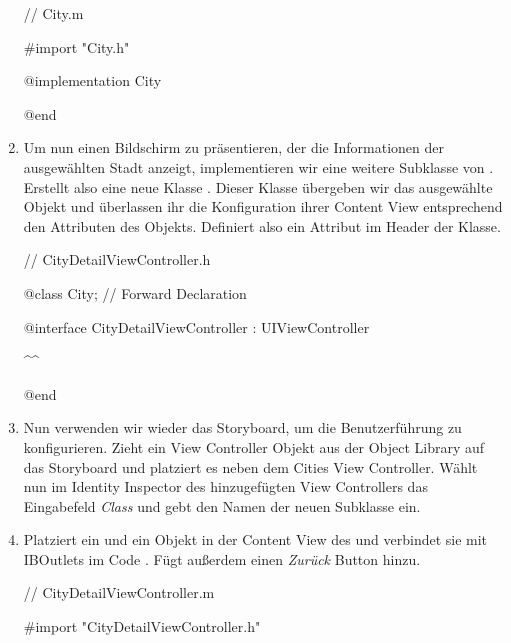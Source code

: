 \documentclass[parskip=half, final]{scrreprt}
\begin{document}
\begin{lecture}
\begin{enumerate}
\begin{objclst}
// City.m

#import "City.h"

@implementation City

@end
\end{objclst}

\item Um nun einen Bildschirm zu präsentieren, der die Informationen der ausgewählten Stadt anzeigt, implementieren wir eine weitere Subklasse von . Erstellt also eine neue Klasse . Dieser Klasse übergeben wir das ausgewählte  Objekt und überlassen ihr die Konfiguration ihrer Content View entsprechend den Attributen des Objekts. Definiert also ein Attribut  im Header der  Klasse.

\begin{objclst}
// CityDetailViewController.h

@class City; // Forward Declaration

@interface CityDetailViewController : UIViewController

^^

@end
\end{objclst}

\item Nun verwenden wir wieder das Storyboard, um die Benutzerführung zu konfigurieren. Zieht ein View Controller Objekt aus der Object Library auf das Storyboard und platziert es neben dem Cities View Controller. Wählt nun im Identity Inspector des hinzugefügten View Controllers das Eingabefeld \emph{Class} und gebt den Namen der neuen  Subklasse  ein.

\item Platziert ein  und ein  Objekt in der Content View des  und verbindet sie mit IBOutlets im Code . Fügt außerdem einen \emph{Zurück} Button hinzu.


\begin{objclst}
// CityDetailViewController.m

#import "CityDetailViewController.h"


\end{objclst}
\end{enumerate}
\end{lecture}
\end{document}
